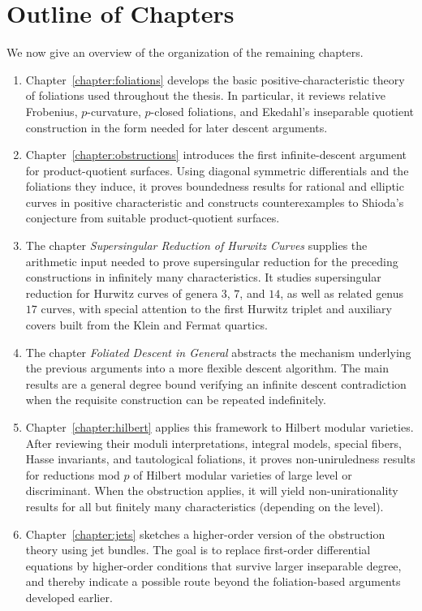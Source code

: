 \documentclass[main.tex]{subfiles}
\begin{document}
\section{Outline of Chapters}

We now give an overview of the organization of the remaining chapters.

\begin{enumerate}
\item Chapter~\ref{chapter:foliations} develops the basic positive-characteristic theory of foliations used throughout the thesis. In particular, it reviews relative Frobenius, $p$-curvature, $p$-closed foliations, and Ekedahl's inseparable quotient construction in the form needed for later descent arguments.
\item Chapter~\ref{chapter:obstructions} introduces the first infinite-descent argument for product-quotient surfaces. Using diagonal symmetric differentials and the foliations they induce, it proves boundedness results for rational and elliptic curves in positive characteristic and constructs counterexamples to Shioda's conjecture from suitable product-quotient surfaces.
\item The chapter \textit{Supersingular Reduction of Hurwitz Curves} supplies the arithmetic input needed to prove supersingular reduction for the preceding constructions in infinitely many characteristics. It studies supersingular reduction for Hurwitz curves of genera $3$, $7$, and $14$, as well as related genus $17$ curves, with special attention to the first Hurwitz triplet and auxiliary covers built from the Klein and Fermat quartics.
\item The chapter \textit{Foliated Descent in General} abstracts the mechanism underlying the previous arguments into a more flexible descent algorithm. The main results are a general degree bound verifying an infinite descent contradiction when the requisite construction can be repeated indefinitely.
\item Chapter~\ref{chapter:hilbert} applies this framework to Hilbert modular varieties. After reviewing their moduli interpretations, integral models, special fibers, Hasse invariants, and tautological foliations, it proves non-uniruledness results for reductions mod $p$ of Hilbert modular varieties of large level or discriminant. When the obstruction applies, it will yield non-unirationality results for all but finitely many characteristics (depending on the level).
\item Chapter~\ref{chapter:jets} sketches a higher-order version of the obstruction theory using jet bundles. The goal is to replace first-order differential equations by higher-order conditions that survive larger inseparable degree, and thereby indicate a possible route beyond the foliation-based arguments developed earlier.
\end{enumerate}
\end{document}
